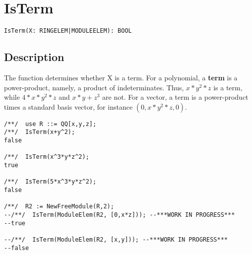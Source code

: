 \documentclass[a4paper]{mybook}
\newenvironment{command}{}{} %
\begin{document}
\section{IsTerm}
\label{IsTerm}
\begin{command} %


\begin{Verbatim}[label=syntax, rulecolor=\color{MidnightBlue},
frame=single]
IsTerm(X: RINGELEM|MODULEELEM): BOOL
\end{Verbatim}


\subsection*{Description}

The function determines whether X is a term.  For a polynomial, a
\textbf{term} is a power-product, namely, a product of indeterminates.
Thus, $x*y^2*z$ is a term, while $4*x*y^2*z$ and $x*y+z^3$ are not.
For a vector, a term is a power-product times a standard basis vector, for
instance $(0, x*y^2*z, 0)$.
\begin{Verbatim}[label=example, rulecolor=\color{PineGreen}, frame=single]
/**/  use R ::= QQ[x,y,z];
/**/  IsTerm(x+y^2);
false

/**/  IsTerm(x^3*y*z^2);
true

/**/  IsTerm(5*x^3*y*z^2);
false

/**/  R2 := NewFreeModule(R,2);
--/**/  IsTerm(ModuleElem(R2, [0,x*z])); --***WORK IN PROGRESS***
--true

--/**/  IsTerm(ModuleElem(R2, [x,y])); --***WORK IN PROGRESS***
--false
\end{Verbatim}


\end{command} %
\end{document}
